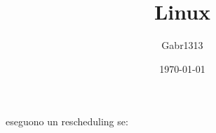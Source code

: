 \documentclass[12pt, a4paper]{report}
\title{Linux}
\author{Gabr1313}
\date{\today}
\begin{document}
eseguono un rescheduling se:
\end{document}
